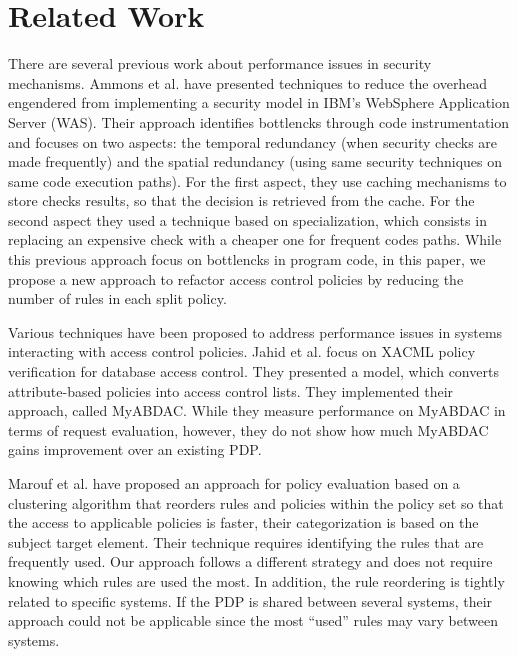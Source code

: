 \section{Related Work} \label{sec:related}

There are several previous work about performance issues in security mechanisms.
Ammons et al.\cite{largesystems} have presented techniques to reduce the overhead engendered from implementing a security model 
in IBM's WebSphere Application Server (WAS). Their approach identifies bottlencks through code instrumentation and focuses on two aspects: the temporal redundancy (when security checks are made frequently) and the spatial redundancy
(using same security techniques on same code execution paths).
For the first aspect, they use caching mechanisms to store checks results, so that the decision is retrieved from the cache.
For the second aspect they used a technique based on specialization, which consists in replacing an expensive check with a cheaper one for frequent codes paths.
While this previous approach focus on bottlencks in program code, in this paper, we propose a new
approach to refactor access control policies by reducing the number of rules in each split policy.



Various techniques \cite{MyABDAC, clustering, decomposition} have been proposed to address performance issues in systems interacting with access control policies. 
Jahid et al. \cite{MyABDAC} focus on XACML
policy verification for database access control. They presented a model, which converts attribute-based policies into access control lists. They implemented their approach, called MyABDAC.
While they measure performance on MyABDAC in terms of request evaluation, however, they do not show how much MyABDAC
gains improvement over an existing PDP.


Marouf et al. \cite{clustering} have proposed an approach for policy evaluation based on a 
clustering algorithm that reorders rules and policies within the policy set so that the access to applicable policies is faster, their categorization is based on
 the subject target element. Their technique requires identifying the rules that are frequently used. Our approach follows a different strategy and does not require knowing which 
rules are used the most. In addition, the rule reordering is tightly related to specific systems. If the PDP is shared between several
 systems, their approach could not be applicable since the most ``used'' rules may vary between systems. \\



